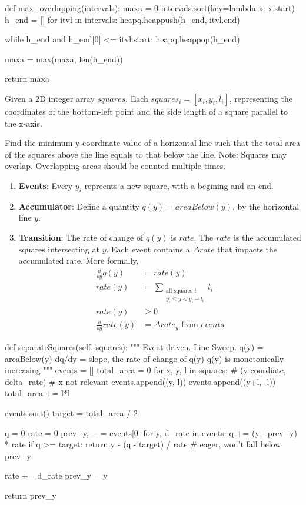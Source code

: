 \begin{python}
def max_overlapping(intervals):
    maxa = 0
    intervals.sort(key=lambda x: x.start)
    h_end = []
    for itvl in intervals:
        heapq.heappush(h_end, itvl.end)
        
        while h_end and h_end[0] <= itvl.start:
            heapq.heappop(h_end)

        maxa = max(maxa, len(h_end))

    return maxa
\end{python}

 Given a 2D integer array $squares$. Each $squares_i = [x_i, y_i, l_i]$, representing the coordinates of the bottom-left point and the side length of a square parallel to the x-axis.

Find the minimum y-coordinate value of a horizontal line such that the total area of the squares above the line equals to that below the line. Note: Squares may overlap. Overlapping areas should be counted multiple times.

\begin{enumerate}
\item \textbf{Events}: Every $y_i$ repreents a new square, with a begining and an end. 
\item \textbf{Accumulator}: Define a quantity $q(y) = areaBelow(y)$, by the horizontal line $y$. 
\item \textbf{Transition}: The rate of change of $q(y)$ is $rate$. The $rate$ is the accumulated squares intersecting at $y$. Each event contains a $\Delta rate$ that impacts the accumulated rate. More formally,
\begin{align*}
  \frac{\dd}{\dd y}q(y) &= rate(y) \\
  rate(y) &= \sum_{\substack{\text{all squares }i \\ y_i \le y < y_i + l_i}} l_i \\ 
  rate(y) &\geq 0 \\
  \frac{\dd}{\dd y}rate(y) &= \Delta {rate}_y \text{ from } events
\end{align*}
\end{enumerate}
\begin{python}
def separateSquares(self, squares):
    """
    Event driven. Line Sweep.
    q(y) = areaBelow(y)
    dq/dy = slope, the rate of change of q(y)
    q(y) is monotonically increasing 
    """
    events = []
    total_area = 0
    for x, y, l in squares:
        # (y-coordiate, delta_rate)
        # x not relevant
        events.append((y, l))
        events.append((y+l, -l))
        total_area += l*l
    
    events.sort()
    target = total_area / 2

    q = 0 
    rate = 0
    prev_y, _ = events[0]
    for y, d_rate in events:
        q += (y - prev_y) * rate
        if q >= target:
            return y - (q - target) / rate
            # eager, won't fall below prev_y

        rate += d_rate
        prev_y = y
    
    return prev_y
\end{python}

